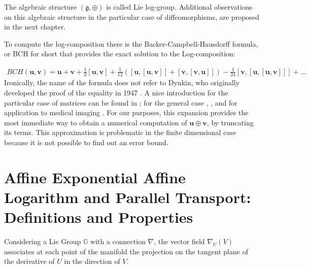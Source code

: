 \noindent
The algebraic structure $(\mathfrak{g} , \oplus)$ is called Lie log-group. Additional observations on this algebraic structure in the particular case of diffeomorphisms, are proposed in the next chapter.

To compute the log-composition there is the Backer-Campbell-Hausdorff formula, or BCH for short
that provides the exact solution to the Log-composition: 

\begin{align*}
BCH(\mathbf{u},\mathbf{v}) 
= 
\mathbf{u} + \mathbf{v} + \frac{1}{2}[\mathbf{u},\mathbf{v}] + \frac{1}{12}([\mathbf{u},[\mathbf{u},\mathbf{v}]]
+ [\mathbf{v},[\mathbf{v},\mathbf{u}]]) - \frac{1}{24}[\mathbf{v},[\mathbf{u},[\mathbf{u},\mathbf{v}]]] +... 
\end{align*}
Ironically, the name of the formula does not refer to Dynkin, who originally developed the proof of the equality in 1947 \cite{dynkin1947calculation}. A nice introduction for the particular case of matrices can be found in \cite{hall2015lie}; for the general case \cite{klarsfeld1989baker}, \cite{serre2009lie}, and for application to medical imaging \cite{vercauteren08}.
For our purposes, this expansion provides the most immediate way to obtain a numerical computation of $\mathbf{u}\oplus \mathbf{v}$, by truncating its terms. This approximation is problematic in the finite dimensional case because it is not possible to find out an error bound.

\section{Affine Exponential Affine Logarithm and Parallel Transport: Definitions and Properties}

Considering a Lie Group $\mathbb{G}$ with a connection $\nabla$, the vector field $\nabla_{U}(V)$ associates at each point of the manifold the projection on the tangent plane of the derivative of $U$ in the direction of $V$. 

